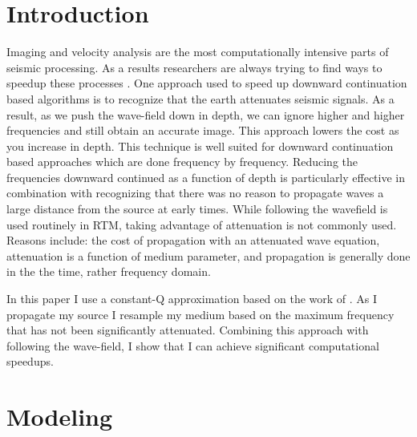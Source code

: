 \section{Introduction}
Imaging and velocity analysis are the most computationally intensive parts
of seismic processing. As a results researchers are always trying
to find ways to speedup these processes \cite[]{bednar,Stork}.
One approach used to speed up downward continuation based
algorithms is to recognize that the earth attenuates seismic signals.
As a result, as we push the wave-field down in depth, we can ignore
higher and higher frequencies and still obtain an accurate image\cite[]{Clapp.sep.111.bob3}.
This approach lowers the cost as you increase in depth. This technique is well
suited for downward continuation based approaches which are done
frequency by frequency.
Reducing the frequencies downward
continued as a function of depth  is particularly effective in combination with recognizing
that there was no reason to propagate waves a large distance from
the source at early times. 
While following the wavefield is used routinely in RTM,  taking
advantage of attenuation is not commonly used.  Reasons include:
the cost of propagation with an attenuated wave equation, 
attenuation is a function of medium parameter, and propagation 
is generally done in the the time, rather frequency domain.
\par
In this paper I use a constant-Q approximation based on the work of \cite{zhu}.  As
I propagate my source I resample my medium based on the maximum frequency that has not
been significantly attenuated. Combining this approach with following the wave-field,
I show that I can achieve significant computational speedups.






\section{Modeling}

